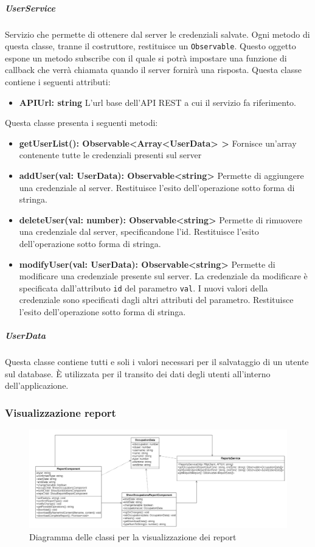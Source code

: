 \subparagraph{UserService}
Servizio che permette di ottenere dal server le credenziali salvate. Ogni metodo di questa classe, tranne il costruttore, restituisce un \texttt{Observable}. Questo oggetto espone un metodo subscribe con il quale si potrà impostare una funzione di callback che verrà chiamata quando il server fornirà una risposta. \newline
Questa classe contiene i seguenti attributi:
\begin{itemize}
	\item \textbf{APIUrl: string}
	L'url base dell'API REST a cui il servizio fa riferimento.
\end{itemize}
Questa classe presenta i seguenti metodi:
\begin{itemize}
	\item \textbf{getUserList(): Observable<Array<UserData> >} \newline
	Fornisce un'array contenente tutte le credenziali presenti sul server
	\item \textbf{addUser(val: UserData): Observable<string>} \newline
	Permette di aggiungere una credenziale al server. Restituisce l'esito dell'operazione sotto forma di stringa.
	\item \textbf{deleteUser(val: number): Observable<string>} \newline
	Permette di rimuovere una credenziale dal server, specificandone l'id. Restituisce l'esito dell'operazione sotto forma di stringa.
	\item \textbf{modifyUser(val: UserData): Observable<string>} \newline
	Permette di modificare una credenziale presente sul server. La credenziale da modificare è specificata dall'attributo \texttt{id} del parametro \texttt{val}. I nuovi valori della credenziale sono specificati dagli altri attributi del parametro. Restituisce l'esito dell'operazione sotto forma di stringa.
\end{itemize}
\subparagraph{UserData}
Questa classe contiene tutti e soli i valori necessari per il salvataggio di un utente sul database. È utilizzata per il transito dei dati degli utenti all'interno dell'applicazione. \newline

\subsubsection{Visualizzazione report}
\begin{figure}[H]
	\centering
	\includegraphics[width=18cm]{res/images/webapp-report-diagrammaClassi.png}
	\caption{Diagramma delle classi per la visualizzazione dei report}
	\label{fig:DiagrammaClassiReport}
\end{figure}

